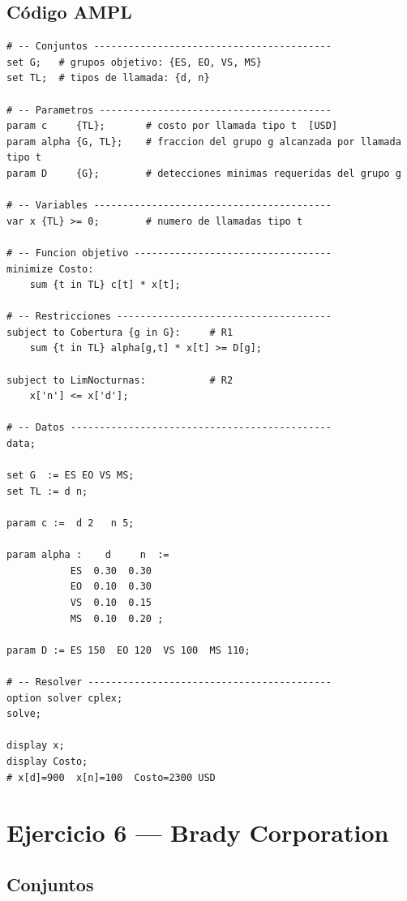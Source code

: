 \documentclass[12pt,a4paper]{article}
\begin{document}
\subsection{Código AMPL}
\begin{lstlisting}[caption={Encuesta Telefónica -- Modelo AMPL}]
# -- Conjuntos -----------------------------------------
set G;   # grupos objetivo: {ES, EO, VS, MS}
set TL;  # tipos de llamada: {d, n}

# -- Parametros ----------------------------------------
param c     {TL};       # costo por llamada tipo t  [USD]
param alpha {G, TL};    # fraccion del grupo g alcanzada por llamada tipo t
param D     {G};        # detecciones minimas requeridas del grupo g

# -- Variables -----------------------------------------
var x {TL} >= 0;        # numero de llamadas tipo t

# -- Funcion objetivo ----------------------------------
minimize Costo:
    sum {t in TL} c[t] * x[t];

# -- Restricciones -------------------------------------
subject to Cobertura {g in G}:     # R1
    sum {t in TL} alpha[g,t] * x[t] >= D[g];

subject to LimNocturnas:           # R2
    x['n'] <= x['d'];

# -- Datos ---------------------------------------------
data;

set G  := ES EO VS MS;
set TL := d n;

param c :=  d 2   n 5;

param alpha :    d     n  :=
           ES  0.30  0.30
           EO  0.10  0.30
           VS  0.10  0.15
           MS  0.10  0.20 ;

param D := ES 150  EO 120  VS 100  MS 110;

# -- Resolver ------------------------------------------
option solver cplex;
solve;

display x;
display Costo;
# x[d]=900  x[n]=100  Costo=2300 USD
\end{lstlisting}

\clearpage
\section{Ejercicio 6 — Brady Corporation}

\subsection{Conjuntos}
\end{document}

